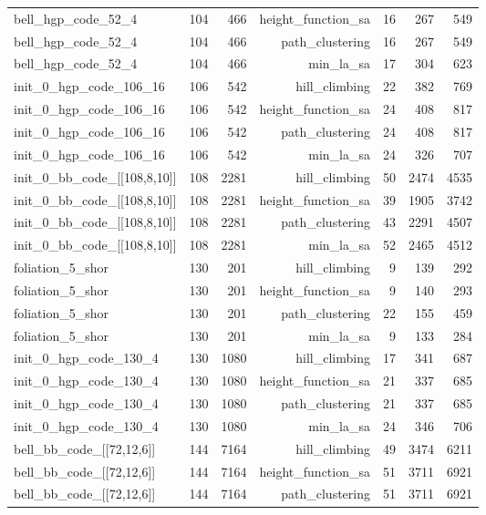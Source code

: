 \begin{longtable}{lrrrrrr}
  bell\_hgp\_code\_52\_4 & 104 & 466 & height\_function\_sa & 16 & 267 & 549 \\
  bell\_hgp\_code\_52\_4 & 104 & 466 & path\_clustering & 16 & 267 & 549 \\
  bell\_hgp\_code\_52\_4 & 104 & 466 & min\_la\_sa & 17 & 304 & 623 \\
  init\_0\_hgp\_code\_106\_16 & 106 & 542 & hill\_climbing & 22 & 382 & 769 \\
  init\_0\_hgp\_code\_106\_16 & 106 & 542 & height\_function\_sa & 24 & 408 & 817 \\
  init\_0\_hgp\_code\_106\_16 & 106 & 542 & path\_clustering & 24 & 408 & 817 \\
  init\_0\_hgp\_code\_106\_16 & 106 & 542 & min\_la\_sa & 24 & 326 & 707 \\
  init\_0\_bb\_code\_[[108,8,10]] & 108 & 2281 & hill\_climbing & 50 & 2474 & 4535 \\
  init\_0\_bb\_code\_[[108,8,10]] & 108 & 2281 & height\_function\_sa & 39 & 1905 & 3742 \\
  init\_0\_bb\_code\_[[108,8,10]] & 108 & 2281 & path\_clustering & 43 & 2291 & 4507 \\
  init\_0\_bb\_code\_[[108,8,10]] & 108 & 2281 & min\_la\_sa & 52 & 2465 & 4512 \\
  foliation\_5\_shor & 130 & 201 & hill\_climbing & 9 & 139 & 292 \\
  foliation\_5\_shor & 130 & 201 & height\_function\_sa & 9 & 140 & 293 \\
  foliation\_5\_shor & 130 & 201 & path\_clustering & 22 & 155 & 459 \\
  foliation\_5\_shor & 130 & 201 & min\_la\_sa & 9 & 133 & 284 \\
  init\_0\_hgp\_code\_130\_4 & 130 & 1080 & hill\_climbing & 17 & 341 & 687 \\
  init\_0\_hgp\_code\_130\_4 & 130 & 1080 & height\_function\_sa & 21 & 337 & 685 \\
  init\_0\_hgp\_code\_130\_4 & 130 & 1080 & path\_clustering & 21 & 337 & 685 \\
  init\_0\_hgp\_code\_130\_4 & 130 & 1080 & min\_la\_sa & 24 & 346 & 706 \\
  bell\_bb\_code\_[[72,12,6]] & 144 & 7164 & hill\_climbing & 49 & 3474 & 6211 \\
  bell\_bb\_code\_[[72,12,6]] & 144 & 7164 & height\_function\_sa & 51 & 3711 & 6921 \\
  bell\_bb\_code\_[[72,12,6]] & 144 & 7164 & path\_clustering & 51 & 3711 & 6921 \\

\end{longtable}
